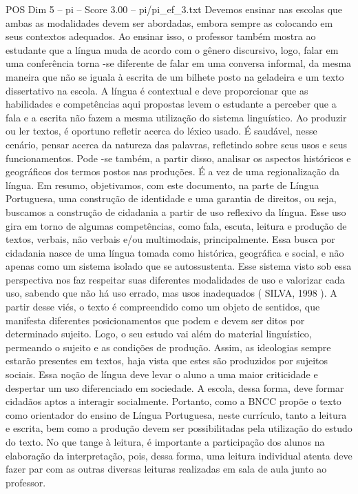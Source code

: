 \begin{textsample}{POS Dim 5 – pi – Score 3.00 – pi/pi\_ef\_3.txt}
Devemos ensinar nas escolas que ambas as modalidades devem ser abordadas, embora sempre as colocando em seus contextos adequados.
Ao ensinar isso, o professor também mostra ao estudante que a língua muda de acordo com o gênero discursivo, logo, falar em uma conferência torna -se diferente de falar em uma conversa informal, da mesma maneira que não se iguala à escrita de um bilhete posto na geladeira e um texto dissertativo na escola.
A língua é contextual e deve proporcionar que as habilidades e competências aqui propostas levem o estudante a perceber que a fala e a escrita não fazem a mesma utilização do sistema linguístico.
Ao produzir ou ler textos, é oportuno refletir acerca do léxico usado.
É saudável, nesse cenário, pensar acerca da natureza das palavras, refletindo sobre seus usos e seus funcionamentos.
Pode -se também, a partir disso, analisar os aspectos históricos e geográficos dos termos postos nas produções.
É a vez de uma regionalização da língua.
Em resumo, objetivamos, com este documento, na parte de Língua Portuguesa, uma construção de identidade e uma garantia de direitos, ou seja, buscamos a construção de cidadania a partir de uso reflexivo da língua.
Esse uso gira em torno de algumas competências, como fala, escuta, leitura e produção de textos, verbais, não verbais e/ou multimodais, principalmente.
Essa busca por cidadania nasce de uma língua tomada como histórica, geográfica e social, e não apenas como um sistema isolado que se autossustenta.
Esse sistema visto sob essa perspectiva nos faz respeitar suas diferentes modalidades de uso e valorizar cada uso, sabendo que não há uso errado, mas usos inadequados ( SILVA, 1998 ).
A partir desse viés, o texto é compreendido como um objeto de sentidos, que manifesta diferentes posicionamentos que podem e devem ser ditos por determinado sujeito.
Logo, o seu estudo vai além do material linguístico, permeando o sujeito e as condições de produção.
Assim, as ideologias sempre estarão presentes em textos, haja vista que estes são produzidos por sujeitos sociais.
Essa noção de língua deve levar o aluno a uma maior criticidade e despertar um uso diferenciado em sociedade.
A escola, dessa forma, deve formar cidadãos aptos a interagir socialmente.
Portanto, como a BNCC propõe o texto como orientador do ensino de Língua Portuguesa, neste currículo, tanto a leitura e escrita, bem como a produção devem ser possibilitadas pela utilização do estudo do texto.
No que tange à leitura, é importante a participação dos alunos na elaboração da interpretação, pois, dessa forma, uma leitura individual atenta deve fazer par com as outras diversas leituras realizadas em sala de aula junto ao professor.

\end{textsample}
